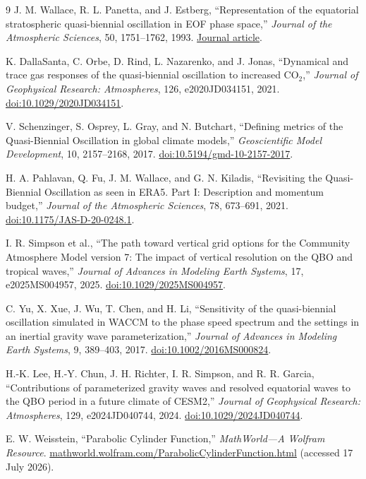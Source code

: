 \documentclass[11pt,a4paper]{article}
\begin{document}
\begin{thebibliography}{9}
J. M. Wallace, R. L. Panetta, and J. Estberg,
``Representation of the equatorial stratospheric quasi-biennial oscillation
in EOF phase space,'' \emph{Journal of the Atmospheric Sciences}, 50,
1751--1762, 1993.
\href{https://journals.ametsoc.org/view/journals/atsc/50/12/1520-0469_1993_050_1751_rotesq_2_0_co_2.xml}
{Journal article}.

K. DallaSanta, C. Orbe, D. Rind, L. Nazarenko, and J. Jonas,
``Dynamical and trace gas responses of the quasi-biennial oscillation to
increased CO$_2$,'' \emph{Journal of Geophysical Research: Atmospheres},
126, e2020JD034151, 2021.
\href{https://doi.org/10.1029/2020JD034151}
{doi:10.1029/2020JD034151}.

V. Schenzinger, S. Osprey, L. Gray, and N. Butchart,
``Defining metrics of the Quasi-Biennial Oscillation in global climate
models,'' \emph{Geoscientific Model Development}, 10, 2157--2168, 2017.
\href{https://doi.org/10.5194/gmd-10-2157-2017}
{doi:10.5194/gmd-10-2157-2017}.

H. A. Pahlavan, Q. Fu, J. M. Wallace, and G. N. Kiladis,
``Revisiting the Quasi-Biennial Oscillation as seen in ERA5. Part I:
Description and momentum budget,'' \emph{Journal of the Atmospheric
Sciences}, 78, 673--691, 2021.
\href{https://doi.org/10.1175/JAS-D-20-0248.1}
{doi:10.1175/JAS-D-20-0248.1}.

I. R. Simpson et al.,
``The path toward vertical grid options for the Community Atmosphere Model
version 7: The impact of vertical resolution on the QBO and tropical waves,''
\emph{Journal of Advances in Modeling Earth Systems}, 17, e2025MS004957,
2025.
\href{https://doi.org/10.1029/2025MS004957}
{doi:10.1029/2025MS004957}.

C. Yu, X. Xue, J. Wu, T. Chen, and H. Li,
``Sensitivity of the quasi-biennial oscillation simulated in WACCM to the
phase speed spectrum and the settings in an inertial gravity wave
parameterization,'' \emph{Journal of Advances in Modeling Earth Systems}, 9,
389--403, 2017.
\href{https://doi.org/10.1002/2016MS000824}
{doi:10.1002/2016MS000824}.

H.-K. Lee, H.-Y. Chun, J. H. Richter, I. R. Simpson, and R. R. Garcia,
``Contributions of parameterized gravity waves and resolved equatorial waves
to the QBO period in a future climate of CESM2,'' \emph{Journal of
Geophysical Research: Atmospheres}, 129, e2024JD040744, 2024.
\href{https://doi.org/10.1029/2024JD040744}
{doi:10.1029/2024JD040744}.

E. W. Weisstein,
``Parabolic Cylinder Function,'' \emph{MathWorld---A Wolfram Resource}.
\href{https://mathworld.wolfram.com/ParabolicCylinderFunction.html}
{mathworld.wolfram.com/ParabolicCylinderFunction.html} (accessed 17 July
2026).
\end{thebibliography}
\end{document}
